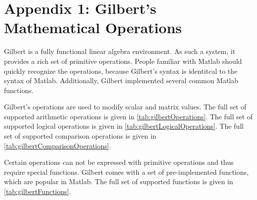 \chapter{Appendix 1: Gilbert's Mathematical Operations}
\label{appendix:GilbertOps}
\appendix

\captionsetup[table]{list=no}

Gilbert is a fully functional linear algebra environment.
As such a system, it provides a rich set of primitive operations.
People familiar with Matlab should quickly recognize the operations, because Gilbert's syntax is identitcal to the syntax of Matlab.
Additionally, Gilbert implemented several common Matlab functions.

Gilbert's operations are used to modify scalar and matrix values.
The full set of supported arithmetic operations is given in \cref{tab:gilbertOperations}.
The full set of supported logical operations is given in \cref{tab:gilbertLogicalOperations}.
The full set of supported comparison operations is given in \cref{tab:gilbertComparisonOperations}.

Certain operations can not be expressed with primitive operations and thus require special functions.
Gilbert comes with a set of pre-implemented functions, which are popular in Matlab.
The full set of supported functions is given in \cref{tab:gilbertFunctions}.


